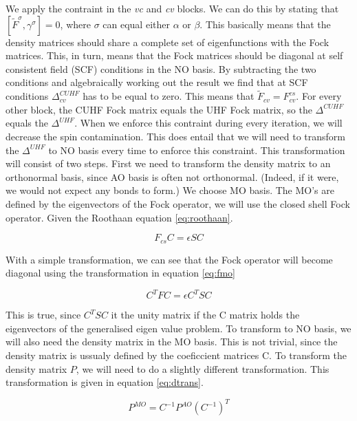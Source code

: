 \documentclass[twoside,twocolumn,9pt]{article}
\begin{document}
We apply the contraint in the \textit{vc} and \textit{cv} blocks. We can do this by stating that $[\tilde{F}^\sigma, \gamma^\sigma] = 0$, where $\sigma$ can equal either $\alpha$
or $\beta$. This basically means that the density matrices should share a complete set of eigenfunctions with the Fock matrices. This, in turn, means that the Fock matrices should be
diagonal at self consistent field (SCF) conditions in the NO basis. By subtracting the two conditions and algebraically working out the result we find that at SCF conditions
$\Delta^{CUHF}_{cv}$ has to be equal to zero. This means that $\tilde{F}_{cv} = F_{cv}^{cs}$\cite{Scuseria2010}. For every other block, the CUHF Fock matrix equals the UHF Fock matrix,
so the $\Delta^{CUHF}$ equals the $\Delta^{UHF}$. When we enforce this contraint during every iteration, we will decrease the spin contamination. This does entail that we will need
to transform the $\Delta^{UHF}$ to NO basis every time to enforce this constraint. This transformation will consist of two steps. First we need to transform the density matrix to
an orthonormal basis, since AO basis is often not orthonormal. (Indeed, if it were, we would not expect any bonds to form.) We choose MO basis. The MO's are defined by the
eigenvectors of the Fock operator, we will use the closed shell Fock operator. Given the Roothaan equation \eqref{eq:roothaan}.

\begin{equation}\label{eq:roothaan}
  F_{cs}C = \epsilon S C
\end{equation}

With a simple transformation, we can see that the Fock operator will become diagonal using the transformation in equation \eqref{eq:fmo}

\begin{equation}\label{eq:fmo}
  C^T F C = \epsilon C^T S C
\end{equation}

This is true, since $C^T S C$ it the unity matrix if the C matrix holds the eigenvectors of the generalised eigen value problem. To transform to NO basis, we will also need the
density matrix in the MO basis. This is not trivial, since the density matrix is ussualy defined by the coeficcient matrices C. To transform the density matrix $P$, we will need
to do a slightly different transformation. This transformation is given in equation \eqref{eq:dtrans}\cite{Declercq2020}.

\begin{equation}\label{eq:dtrans}
  P^{MO} = C^{-1}P^{AO}(C^{-1})^T
\end{equation}
\end{document}
